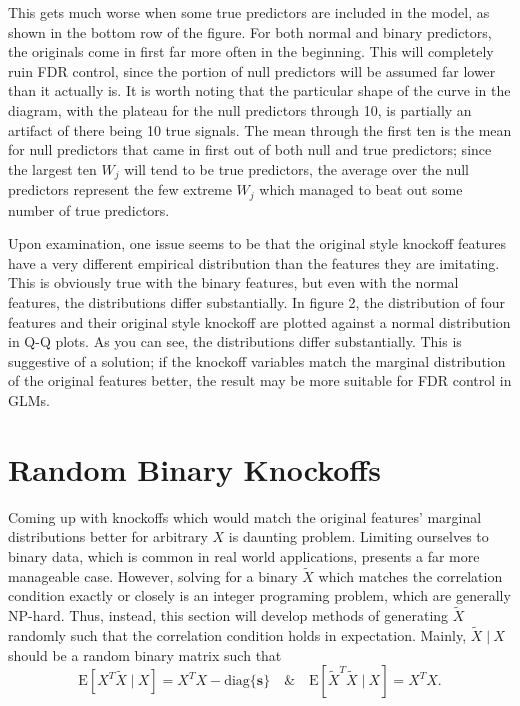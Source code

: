 \documentclass[11pt]{article}
\newcommand{\E}{\mathrm{E}}
\newcommand{\diag}[1]{\mathrm{diag}\{#1\}}
\newcommand{\st}{ \; \big | \:}
\theoremstyle{definition}
\begin{document}
    This gets much worse when some true predictors are included in the model, as shown in the bottom row of the figure. For both normal and binary predictors, the originals come in first far more often in the beginning. This will completely ruin FDR control, since the portion of null predictors will be assumed far lower than it actually is. It is worth noting that the particular shape of the curve in the diagram, with the plateau for the null predictors through 10, is partially an artifact of there being 10 true signals. The mean through the first ten is the mean for null predictors that came in first out of both null and true predictors; since the largest ten $W_j$ will tend to be true predictors, the average over the null predictors represent the few extreme $W_j$ which managed to beat out some number of true predictors.  \par
    Upon examination, one issue seems to be that the original style knockoff features have a very different empirical distribution than the features they are imitating. This is obviously true with the binary features, but even with the normal features, the distributions differ substantially. In figure 2, the distribution of four features and their original style knockoff are plotted against a normal distribution in Q-Q plots. As you can see, the distributions differ substantially. This is suggestive of a solution; if the knockoff variables match the marginal distribution of the original features better, the result may be more suitable for FDR control in GLMs. \par
    \FloatBarrier

\section{Random Binary Knockoffs}
Coming up with knockoffs which would match the original features' marginal distributions better for arbitrary $X$ is daunting problem. Limiting ourselves to binary data, which is common in real world applications, presents a far more manageable case. However, solving for a binary $\tilde X$ which matches the correlation condition exactly or closely is an integer programing problem, which are generally NP-hard. Thus, instead, this section will develop methods of generating $\tilde X$ randomly such that the correlation condition holds in expectation. Mainly, $\tilde X\st X$ should be a random binary matrix such that
    \[ \E[X^T \tilde X \st X] = X^TX - \diag{\mathbf s} \quad \& \quad \E[\tilde X^T \tilde X \st X] = X^TX.\]
\end{document}
